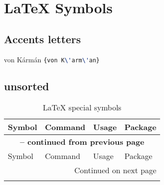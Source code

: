 
\chapter{\LaTeX{} Symbols}
\section{Accents letters}
{von K\'arm\'an} \lstinline[language=TeX]|{von K\'arm\'an}|

\section{unsorted}
\begin{longtable}{|l|l|l|l|}
	\caption{\LaTeX{} special symbols} \label{table: latex special symbols} \\
	
	\hline
	Symbol & Command & Usage & Package\\
	\hline
	\endfirsthead
	
	\multicolumn{4}{c}{{\bfseries \tablename{} \thetable{} -- continued from previous page}}\\
	\hline
	Symbol & Command & Usage & Package\\
	\hline
	\endhead
	
	\multicolumn{4}{r}{Continued on next page}\\
	\hline
	\endfoot
	
	\hline \hline
	\endlastfoot
	

\end{longtable}
